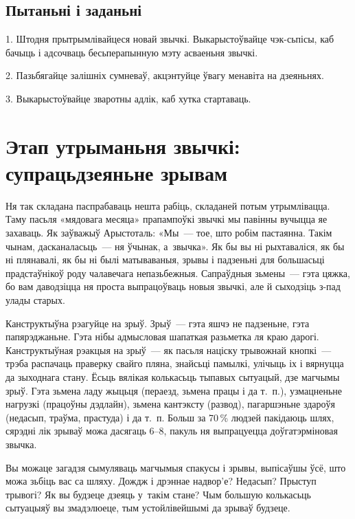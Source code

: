 \subsection*{Пытаньні і заданьні}

1. Штодня прытрымлівайцеся новай звычкі. Выкарыстоўвайце чэк-сьпісы, каб бачыць і адсочваць бесьперапынную мэту асваеньня звычкі.

2. Пазьбягайце залішніх сумневаў, акцэнтуйце ўвагу менавіта на дзеяньнях.

3. Выкарыстоўвайце зваротны адлік, каб хутка стартаваць.


\section{Этап утрыманьня звычкі: супрацьдзеяньне зрывам}

Ня так складана паспрабаваць нешта рабіць, складаней потым утрымлівацца. Таму пасьля «мядовага месяца» прапампоўкі звычкі мы павінны вучыцца яе захаваць. Як заўважыў Арыстоталь: «Мы~--- тое, што робім пастаянна. Такім чынам, дасканаласьць~--- ня ўчынак, а~звычка». Як бы вы ні рыхтаваліся, як бы ні плянавалі, як бы ні былі матываваныя, зрывы і падзеньні для большасьці прадстаўнікоў роду чалавечага непазьбежныя. Сапраўдныя зьмены~--- гэта цяжка, бо вам даводзіцца ня проста выпрацоўваць новыя звычкі, але й сыходзіць з-пад улады старых.

Канструктыўна рэагуйце на зрыў. Зрыў~--- гэта яшчэ не падзеньне, гэта папярэджаньне. Гэта нібы адмысловая шапаткая разьметка ля краю дарогі. Канструктыўная рэакцыя на зрыў~--- як пасьля націску трывожнай кнопкі~--- трэба распачаць праверку свайго пляна, знайсьці памылкі, улічыць іх і вярнуцца да зыходнага стану. Ёсьць вялікая колькасьць тыпавых сытуацый, дзе магчымы зрыў. Гэта зьмена ладу жыцьця (пераезд, зьмена працы і да т.~п.), узмацненьне нагрузкі (працоўны дэдлайн), зьмена кантэксту (развод), пагаршэньне здароўя (недасып, траўма, прастуда) і да т.~п. Больш за 70\,\% людзей пакідаюць шлях, сярэдні лік зрываў можа дасягаць 6--8, пакуль ня выпрацуецца доўгатэрміновая звычка.

Вы можаце загадзя сымуляваць магчымыя спакусы і зрывы, выпісаўшы ўсё, што можа зьбіць вас са шляху. Дождж і дрэннае надвор'е? Недасып? Прыступ трывогі? Як вы будзеце дзеяць у~такім стане? Чым большую колькасьць сытуацыяў вы змадэлюеце, тым устойлівейшымі да зрываў будзеце.

